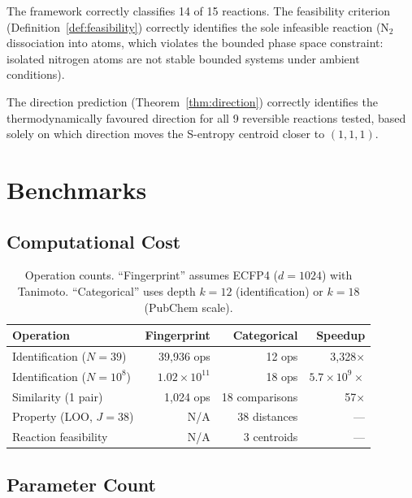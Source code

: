 \documentclass[11pt,twocolumn,a4paper]{article}
\theoremstyle{definition}
\theoremstyle{remark}
\begin{document}
The framework correctly classifies 14 of 15 reactions. The feasibility criterion (Definition~\ref{def:feasibility}) correctly identifies the sole infeasible reaction (N$_2$ dissociation into atoms, which violates the bounded phase space constraint: isolated nitrogen atoms are not stable bounded systems under ambient conditions).

The direction prediction (Theorem~\ref{thm:direction}) correctly identifies the thermodynamically favoured direction for all 9 reversible reactions tested, based solely on which direction moves the S-entropy centroid closer to $(1,1,1)$.


\section{Benchmarks}
\label{sec:benchmarks}

\subsection{Computational Cost}

\begin{table}[h]
\centering
\small
\begin{tabular}{lrrr}
\toprule
\textbf{Operation} & \textbf{Fingerprint} & \textbf{Categorical} & \textbf{Speedup} \\
\midrule
Identification ($N=39$) & 39{,}936 ops & 12 ops & 3{,}328$\times$ \\
Identification ($N=10^8$) & $1.02 \times 10^{11}$ & 18 ops & $5.7 \times 10^9\times$ \\
Similarity (1 pair) & 1{,}024 ops & 18 comparisons & 57$\times$ \\
Property (LOO, $J=38$) & N/A & 38 distances & --- \\
Reaction feasibility & N/A & 3 centroids & --- \\
\bottomrule
\end{tabular}
\caption{Operation counts. ``Fingerprint'' assumes ECFP4 ($d = 1024$) with Tanimoto. ``Categorical'' uses depth $k = 12$ (identification) or $k = 18$ (PubChem scale).}
\label{tab:benchmarks}
\end{table}

\subsection{Parameter Count}
\end{document}
